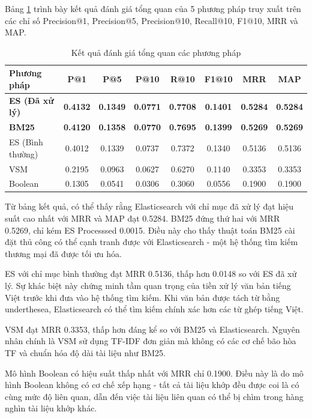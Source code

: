 \documentclass[../BTL.tex]{subfiles}
\begin{document}
Bảng \ref{tab:overall-results} trình bày kết quả đánh giá tổng quan của 5 phương pháp truy xuất trên các chỉ số Precision@1, Precision@5, Precision@10, Recall@10, F1@10, MRR và MAP.

\begin{table}[ht]
\centering
\begin{tabular}{l c c c c c c c}
\hline
Phương pháp & P@1 & P@5 & P@10 & R@10 & F1@10 & MRR & MAP \\
\hline
\textbf{ES (Đã xử lý)} & \textbf{0.4132} & \textbf{0.1349} & \textbf{0.0771} & \textbf{0.7708} & \textbf{0.1401} & \textbf{0.5284} & \textbf{0.5284} \\
\textbf{BM25} & \textbf{0.4120} & \textbf{0.1358} & \textbf{0.0770} & \textbf{0.7695} & \textbf{0.1399} & \textbf{0.5269} & \textbf{0.5269} \\
ES (Bình thường) & 0.4012 & 0.1339 & 0.0737 & 0.7372 & 0.1340 & 0.5136 & 0.5136 \\
VSM & 0.2195 & 0.0963 & 0.0627 & 0.6270 & 0.1140 & 0.3353 & 0.3353 \\
Boolean & 0.1305 & 0.0541 & 0.0306 & 0.3060 & 0.0556 & 0.1900 & 0.1900 \\
\hline
\end{tabular}
\caption{Kết quả đánh giá tổng quan các phương pháp}
\label{tab:overall-results}
\end{table}

Từ bảng kết quả, có thể thấy rằng Elasticsearch với chỉ mục đã xử lý đạt hiệu suất cao nhất với MRR và MAP đạt 0.5284. BM25 đứng thứ hai với MRR 0.5269, chỉ kém ES Processsed 0.0015. Điều này cho thấy thuật toán BM25 cài đặt thủ công có thể cạnh tranh được với Elasticsearch - một hệ thống tìm kiếm thương mại đã được tối ưu hóa.

ES với chỉ mục bình thường đạt MRR 0.5136, thấp hơn 0.0148 so với ES đã xử lý. Sự khác biệt này chứng minh tầm quan trọng của tiền xử lý văn bản tiếng Việt trước khi đưa vào hệ thống tìm kiếm. Khi văn bản được tách từ bằng underthesea, Elasticsearch có thể tìm kiếm chính xác hơn các từ ghép tiếng Việt.

VSM đạt MRR 0.3353, thấp hơn đáng kể so với BM25 và Elasticsearch. Nguyên nhân chính là VSM sử dụng TF-IDF đơn giản mà không có các cơ chế bão hòa TF và chuẩn hóa độ dài tài liệu như BM25.

Mô hình Boolean có hiệu suất thấp nhất với MRR chỉ 0.1900. Điều này là do mô hình Boolean không có cơ chế xếp hạng - tất cả tài liệu khớp đều được coi là có cùng mức độ liên quan, dẫn đến việc tài liệu liên quan có thể bị chìm trong hàng nghìn tài liệu khớp khác.
\end{document}
